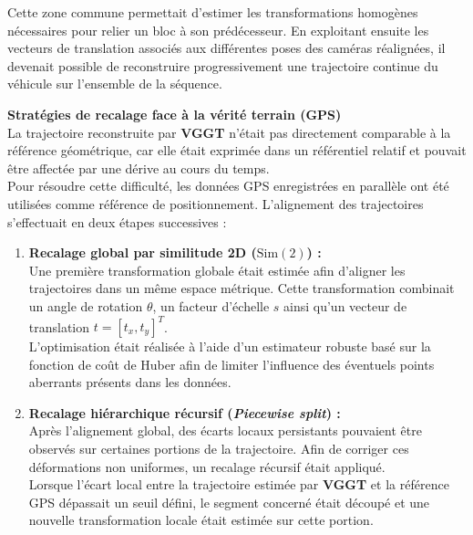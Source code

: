 \documentclass[12pt,a4paper,oneside]{report}
\begin{document}
\hspace*{.3cm}Cette zone commune permettait d'estimer les transformations homogènes nécessaires pour relier un bloc à son prédécesseur. En exploitant ensuite les vecteurs de translation associés aux différentes poses des caméras réalignées, il devenait possible de reconstruire progressivement une trajectoire continue du véhicule sur l'ensemble de la séquence.

\par\bigskip
\par\bigskip

\hspace*{0.4cm}\textbf{Stratégies de recalage face à la vérité terrain (GPS)}\\

\hspace*{.3cm}La trajectoire reconstruite par \textbf{VGGT} n'était pas directement comparable à la référence géométrique, car elle était exprimée dans un référentiel relatif et pouvait être affectée par une dérive au cours du temps.\\

\hspace*{.3cm}Pour résoudre cette difficulté, les données GPS enregistrées en parallèle ont été utilisées comme référence de positionnement. L'alignement des trajectoires s'effectuait en deux étapes successives :

\begin{enumerate}[label=$\bullet$, itemsep=0.5em]

    \item \textbf{Recalage global par similitude 2D ($\text{Sim}(2)$) :}\\
    Une première transformation globale était estimée afin d'aligner les trajectoires dans un même espace métrique. Cette transformation combinait un angle de rotation $\theta$, un facteur d'échelle $s$ ainsi qu'un vecteur de translation $t = [t_x, t_y]^T$.\\
    L'optimisation était réalisée à l'aide d'un estimateur robuste basé sur la fonction de coût de Huber afin de limiter l'influence des éventuels points aberrants présents dans les données.

    \item \textbf{Recalage hiérarchique récursif (\textit{Piecewise split}) :}\\
    Après l'alignement global, des écarts locaux persistants pouvaient être observés sur certaines portions de la trajectoire. Afin de corriger ces déformations non uniformes, un recalage récursif était appliqué.\\
    Lorsque l'écart local entre la trajectoire estimée par \textbf{VGGT} et la référence GPS dépassait un seuil défini, le segment concerné était découpé et une nouvelle transformation locale était estimée sur cette portion.

\end{enumerate}
\end{document}
